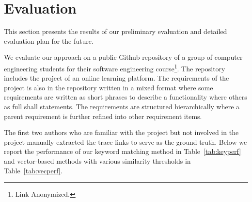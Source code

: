 \section{Evaluation}
\label{sec:eval}



This section presents the results of our preliminary evaluation and detailed evaluation plan for the future.

We evaluate our approach on a public Github repository of a group of computer engineering students for their software engineering course\footnote{Link Anonymized.%
}. The repository includes the project of an online learning platform. The requirements of the project is also in the repository written in a mixed format where some requirements are written as short phrases to describe a functionality where others as full shall statements. The requirements are structured hierarchically where a parent requirement is further refined into other requirement items.

The first two authors who are familiar with the project but not involved in the project manually extracted the trace links to serve as the ground truth. Below we report the performance of our keyword matching method in Table~\ref{tab:keyperf} and vector-based methods with various similarity thresholds in Table~\ref{tab:vecperf}.




